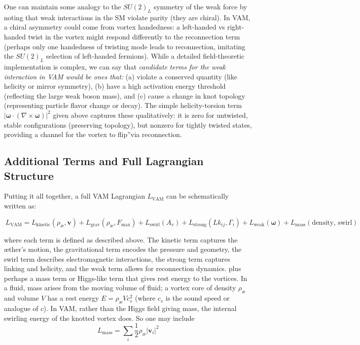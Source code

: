 One can maintain some analogy to the $SU(2)_L$ symmetry of the weak force by noting that weak interactions in the SM violate parity (they are chiral). In VAM, a chiral asymmetry could come from vortex handedness: a left-handed vs right-handed twist in the vortex might respond differently to the reconnection term (perhaps only one handedness of twisting mode leads to reconnection, imitating the $SU(2)_L$ selection of left-handed fermions). While a detailed field-theoretic implementation is complex, we can say that \textit{candidate terms for the weak interaction in VAM would be ones that:} (a) violate a conserved quantity (like helicity or mirror symmetry), (b) have a high activation energy threshold (reflecting the large weak boson mass), and (c) cause a change in knot topology (representing particle flavor change or decay). The simple helicity-torsion term $|\mathbf{\omega}\cdot(\nabla\times\mathbf{\omega})|^2$ given above captures these qualitatively: it is zero for untwisted, stable configurations (preserving topology), but nonzero for tightly twisted states, providing a channel for the vortex to \grqq flip\textquotedblright via reconnection.

\subsection{Additional Terms and Full Lagrangian Structure}
Putting it all together, a full VAM Lagrangian $L_{\text{VAM}}$ can be schematically written as:


\begin{equation}
    \boxed{\ L_{\text{VAM}} = L_{\text{kinetic}}(\rho_{\text{\ae}},\mathbf{v}) + L_{\text{grav}}(\rho_{\text{\ae}},F_{\max}) + L_{\text{swirl}}(A_v) + L_{\text{strong}}(Lk_{ij}, \Gamma_i) + L_{\text{weak}}(\mathbf{\omega}) + L_{\text{mass}}(\text{density, swirl})}
\end{equation}

where each term is defined as described above. The kinetic term captures the æther's motion, the gravitational term encodes the pressure and geometry, the swirl term describes electromagnetic interactions, the strong term captures linking and helicity, and the weak term allows for reconnection dynamics.
plus perhaps a mass term or Higgs-like term that gives rest energy to the vortices. In a fluid, mass arises from the moving volume of fluid; a vortex core of density $\rho_{\text{\ae}}$ and volume $V$ has a rest energy $E = \rho_{\text{\ae}} V c_s^2$ (where $c_s$ is the sound speed or analogue of $c$). In VAM, rather than the Higgs field giving mass, the internal swirling energy of the knotted vortex does. So one may include
\[
    L_{\text{mass}} = \sum_i \frac{1}{2}\rho_{\text{\ae}} |\mathbf{v}_i|^2
\]

